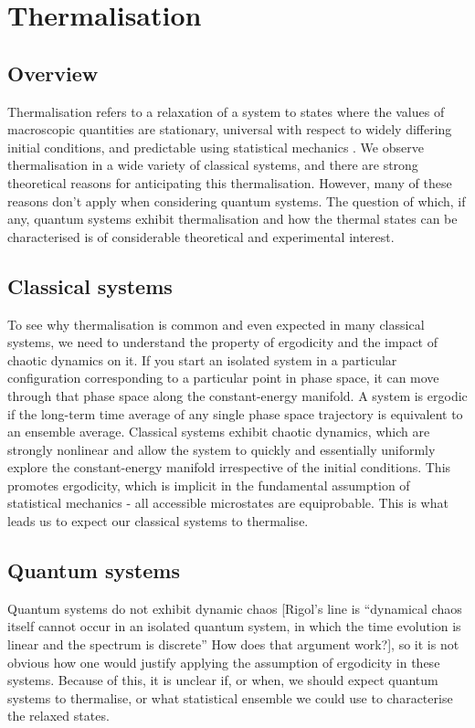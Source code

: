 \documentclass[a4paper,10pt]{article}
\begin{document}
\newpage
\section{Thermalisation}
 \subsection{Overview}
 
Thermalisation refers to a relaxation of a system to states where the values of macroscopic quantities are stationary, universal with respect to 
widely differing initial conditions, and predictable using statistical mechanics \cite{Rigol2008}. We observe thermalisation in a wide variety of classical systems, and there 
are strong theoretical reasons for anticipating this thermalisation. However, many of these reasons don't apply when considering quantum systems. The question of 
which, if any, quantum systems exhibit thermalisation and how the thermal states can be characterised is of considerable theoretical and experimental interest. 

 \subsection{Classical systems}
To see why thermalisation is common and even expected in many classical systems, we need to understand the property of ergodicity and the impact of chaotic dynamics on it. 
If you start an isolated system in a particular configuration corresponding to a particular point in phase space, it can move through that phase space along the constant-energy
manifold. A system is ergodic if the long-term time average of any single phase space trajectory is equivalent to an ensemble average.  
Classical systems  exhibit chaotic dynamics, which are strongly nonlinear and allow the system to quickly 
and essentially uniformly explore the constant-energy manifold irrespective of the initial conditions. This promotes ergodicity, which is implicit in the fundamental assumption of 
statistical mechanics - all accessible microstates are equiprobable.  This is what leads us to expect our classical systems to thermalise.

 \subsection{Quantum systems}
Quantum systems do not  exhibit dynamic chaos  [Rigol's line is ``dynamical chaos itself cannot occur in an isolated quantum system, in which the time 
evolution is linear and the spectrum is discrete'' How does that argument work?], so it is not obvious how one would justify applying the assumption of ergodicity in these systems. Because of 
this, it is unclear if, or when, we should expect quantum systems to thermalise, or what statistical ensemble we could use to characterise the relaxed states. 
\end{document}
